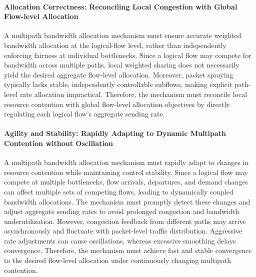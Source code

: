 \paragraph{Allocation Correctness: Reconciling Local Congestion with Global Flow-level Allocation}
A multipath bandwidth allocation mechanism must ensure accurate weighted bandwidth allocation at the logical-flow level, rather than independently enforcing fairness at individual bottlenecks. Since a logical flow may compete for bandwidth across multiple paths, local weighted sharing does not necessarily yield the desired aggregate flow-level allocation. Moreover, packet spraying typically lacks stable, independently controllable subflows, making explicit path-level rate allocation impractical. Therefore, the mechanism must reconcile local resource contention with global flow-level allocation objectives by directly regulating each logical flow's aggregate sending rate.

\paragraph{Agility and Stability: Rapidly Adapting to Dynamic Multipath Contention without Oscillation}
A multipath bandwidth allocation mechanism must rapidly adapt to changes in resource contention while maintaining control stability. Since a logical flow may compete at multiple bottlenecks, flow arrivals, departures, and demand changes can affect multiple sets of competing flows, leading to dynamically coupled bandwidth allocations. The mechanism must promptly detect these changes and adjust aggregate sending rates to avoid prolonged congestion and bandwidth underutilization. However, congestion feedback from different paths may arrive asynchronously and fluctuate with packet-level traffic distribution. Aggressive rate adjustments can cause oscillations, whereas excessive smoothing delays convergence. Therefore, the mechanism must achieve fast and stable convergence to the desired flow-level allocation under continuously changing multipath contention.

